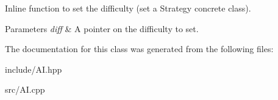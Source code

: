 Inline function to set the difficulty (set a Strategy concrete class). 


\begin{DoxyParams}{Parameters}
{\em diff} & A pointer on the difficulty to set. \\
\hline
\end{DoxyParams}


The documentation for this class was generated from the following files\-:\begin{DoxyCompactItemize}
\item 
include/A\-I.\-hpp\item 
src/A\-I.\-cpp\end{DoxyCompactItemize}
